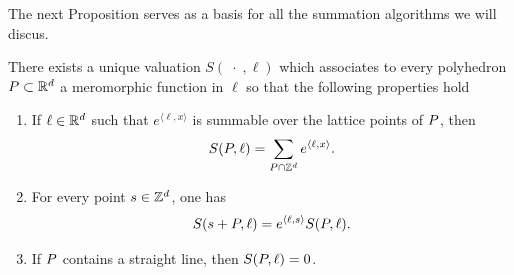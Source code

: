 %
%
%
%
%
%
%
%
%
%
% 
 
The next Proposition serves as a basis for all the summation algorithms we will discus. 

\begin{proposition}\label{valuationI}
There exists a unique valuation  $S(\;\cdot\;,\ell)$ which  associates  to every polyhedron
${ P}\subset {\mathbb R}^d$ a meromorphic function in $\ell$ so that the following properties hold 

\begin{enumerate}
\item If $\ell \in {\mathbb R}^d$ such that $e^{\langle \ell, x\rangle}$ is summable over the lattice points of ${ P}$, then
$$
S({ P},\ell)= \sum_{{ P} \cap {\mathbb Z}^d} e^{\langle \ell,x\rangle}.
$$

\item For every point $s \in {\mathbb Z}^d$, one has
$$
S(s+{ P},\ell) = e^{\langle \ell,s\rangle}S({ P},\ell).
$$
\item If ${ P}$ contains a straight line, then $S({ P},\ell)=0$.
\end{enumerate}
\end{proposition}


